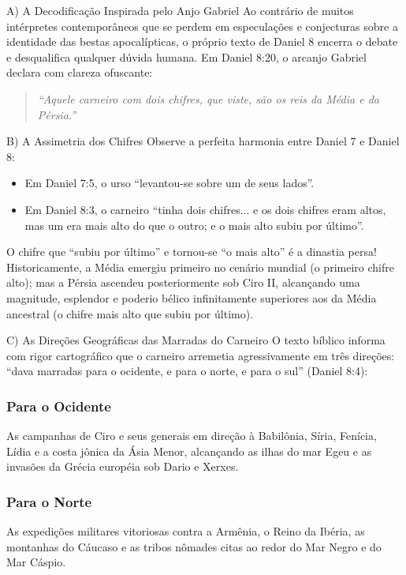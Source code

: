 \documentclass[11pt,a4paper,openany]{book}
\begin{document}
A) A Decodificação Inspirada pelo Anjo Gabriel
Ao contrário de muitos intérpretes contemporâneos que se perdem em especulações e conjecturas sobre a identidade das bestas apocalípticas, o próprio texto de Daniel 8 encerra o debate e desqualifica qualquer dúvida humana. Em Daniel 8:20, o arcanjo Gabriel declara com clareza ofuscante:

\begin{quote}
\itshape ``Aquele carneiro com dois chifres, que viste, são os reis da Média e da Pérsia.''
\end{quote}


B) A Assimetria dos Chifres
Observe a perfeita harmonia entre Daniel 7 e Daniel 8:
\begin{itemize}
  \item Em Daniel 7:5, o urso ``levantou-se sobre um de seus lados''.
  \item Em Daniel 8:3, o carneiro ``tinha dois chifres... e os dois chifres eram altos, mas um era mais alto do que o outro; e o mais alto subiu por último''.
\end{itemize}

O chifre que ``subiu por último'' e tornou-se ``o mais alto'' é a dinastia persa! Historicamente, a Média emergiu primeiro no cenário mundial (o primeiro chifre alto); mas a Pérsia ascendeu posteriormente sob Ciro II, alcançando uma magnitude, esplendor e poderio bélico infinitamente superiores aos da Média ancestral (o chifre mais alto que subiu por último).

C) As Direções Geográficas das Marradas do Carneiro
O texto bíblico informa com rigor cartográfico que o carneiro arremetia agressivamente em três direções: ``dava marradas para o ocidente, e para o norte, e para o sul'' (Daniel 8:4):

\subsubsection*{Para o Ocidente}
As campanhas de Ciro e seus generais em direção à Babilônia, Síria, Fenícia, Lídia e a costa jônica da Ásia Menor, alcançando as ilhas do mar Egeu e as invasões da Grécia européia sob Dario e Xerxes.

\subsubsection*{Para o Norte}
As expedições militares vitoriosas contra a Armênia, o Reino da Ibéria, as montanhas do Cáucaso e as tribos nômades citas ao redor do Mar Negro e do Mar Cáspio.
\end{document}
